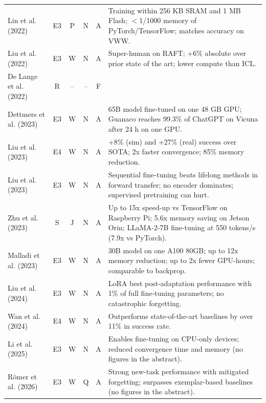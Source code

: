 \documentclass[10pt,a4paper]{article}
\begin{document}
\begin{longtable}{@{}>{\raggedright\arraybackslash}p{4.0cm}cccc>{\raggedright\arraybackslash}p{7.6cm}@{}}
Lin et al. (2022)~\cite{Lin2022} & E3 & P & N & A & Training within 256 KB SRAM and 1 MB Flash; $<$1/1000 memory of PyTorch/TensorFlow; matches accuracy on VWW. \\
Liu et al. (2022)~\cite{Liu2022} & E3 & W & N & A & Super-human on RAFT; +6\% absolute over prior state of the art; lower compute than ICL. \\
De Lange et al. (2022)~\cite{DeLange2022} & R & -- & -- & F &  \\
Dettmers et al. (2023)~\cite{Dettmers2023} & E3 & W & N & A & 65B model fine-tuned on one 48 GB GPU; Guanaco reaches 99.3\% of ChatGPT on Vicuna after 24 h on one GPU. \\
Liu et al. (2023)~\cite{Liu2023} & E4 & W & N & A & +8\% (sim) and +27\% (real) success over SOTA; 2x faster convergence; 85\% memory reduction. \\
Liu et al. (2023)~\cite{Liu2023b} & E3 & W & N & A & Sequential fine-tuning beats lifelong methods in forward transfer; no encoder dominates; supervised pretraining can hurt. \\
Zhu et al. (2023)~\cite{Zhu2023} & S & J & N & A & Up to 15x speed-up vs TensorFlow on Raspberry Pi; 5.6x memory saving on Jetson Orin; LLaMA-2-7B fine-tuning at 550 tokens/s (7.9x vs PyTorch). \\
Malladi et al. (2023)~\cite{Malladi2023} & E3 & W & N & A & 30B model on one A100 80GB; up to 12x memory reduction; up to 2x fewer GPU-hours; comparable to backprop. \\
Liu et al. (2024)~\cite{Liu2024b} & E3 & W & N & A & LoRA best post-adaptation performance with 1\% of full fine-tuning parameters; no catastrophic forgetting. \\
Wan et al. (2024)~\cite{Wan2024} & E4 & W & N & A & Outperforms state-of-the-art baselines by over 11\% in success rate. \\
Li et al. (2025)~\cite{Li2025} & E3 & W & N & A & Enables fine-tuning on CPU-only devices; reduced convergence time and memory (no figures in the abstract). \\
R\"omer et al. (2026)~\cite{Romer2026b} & E3 & W & Q & A & Strong new-task performance with mitigated forgetting; surpasses exemplar-based baselines (no figures in the abstract). \\
\bottomrule\end{longtable}
\end{document}
